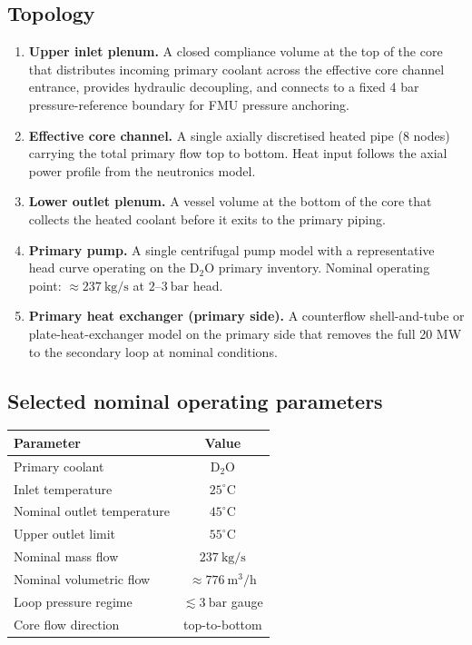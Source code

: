 \documentclass[11pt]{article}
\begin{document}
\subsection{Topology}

\begin{enumerate}
  \item \textbf{Upper inlet plenum.}  A closed compliance volume at the top
        of the core that distributes incoming primary coolant across the
        effective core channel entrance, provides hydraulic decoupling,
        and connects to a fixed 4 bar pressure-reference boundary for FMU
        pressure anchoring.
  \item \textbf{Effective core channel.}  A single axially discretised
        heated pipe (8 nodes) carrying the total primary flow top to
        bottom.  Heat input follows the axial power profile from the
        neutronics model.
  \item \textbf{Lower outlet plenum.}  A vessel volume at the bottom of
        the core that collects the heated coolant before it exits to the
        primary piping.
  \item \textbf{Primary pump.}  A single centrifugal pump model with a
        representative head curve operating on the D$_2$O primary
        inventory.  Nominal operating point: $\approx 237\ \mathrm{kg/s}$
        at $2$--$3\ \mathrm{bar}$ head.
  \item \textbf{Primary heat exchanger (primary side).}  A counterflow
        shell-and-tube or plate-heat-exchanger model on the primary side
        that removes the full 20 MW to the secondary loop at nominal
        conditions.
\end{enumerate}

\subsection{Selected nominal operating parameters}

\begin{center}
\begin{tabular}{lc}
\hline
Parameter & Value \\
\hline
Primary coolant & D$_2$O \\
Inlet temperature & $25^{\circ}\mathrm{C}$ \\
Nominal outlet temperature & $45^{\circ}\mathrm{C}$ \\
Upper outlet limit & $55^{\circ}\mathrm{C}$ \\
Nominal mass flow & $237\ \mathrm{kg/s}$ \\
Nominal volumetric flow & $\approx 776\ \mathrm{m^3/h}$ \\
Loop pressure regime & $\lesssim 3\ \mathrm{bar}$ gauge \\
Core flow direction & top-to-bottom \\
\hline
\end{tabular}
\end{center}
\end{document}
